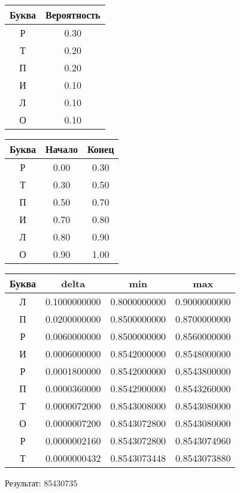\documentclass[a4paper, 12pt]{article}
\begin{document}
\begin{center}
 \begin{tabular}{ |c|c| } 
  \hline
     Буква & Вероятность \\ \hline
Р & 0.30\\\hline
Т & 0.20\\\hline
П & 0.20\\\hline
И & 0.10\\\hline
Л & 0.10\\\hline
О & 0.10
\\ \hline \end{tabular}
\end{center}
\begin{center}
 \begin{tabular}{ |c|c|c| } 
  \hline
     Буква & Начало & Конец \\ \hline
Р & 0.00 & 0.30\\\hline
Т & 0.30 & 0.50\\\hline
П & 0.50 & 0.70\\\hline
И & 0.70 & 0.80\\\hline
Л & 0.80 & 0.90\\\hline
О & 0.90 & 1.00
\\ \hline \end{tabular}
\end{center}
\begin{center}
 \begin{tabular}{ |c|c|c|c| } 
  \hline
     Буква & delta & min & max \\ \hline
Л & 0.1000000000 & 0.8000000000 & 0.9000000000\\\hline
П & 0.0200000000 & 0.8500000000 & 0.8700000000\\\hline
Р & 0.0060000000 & 0.8500000000 & 0.8560000000\\\hline
И & 0.0006000000 & 0.8542000000 & 0.8548000000\\\hline
Р & 0.0001800000 & 0.8542000000 & 0.8543800000\\\hline
П & 0.0000360000 & 0.8542900000 & 0.8543260000\\\hline
Т & 0.0000072000 & 0.8543008000 & 0.8543080000\\\hline
О & 0.0000007200 & 0.8543072800 & 0.8543080000\\\hline
Р & 0.0000002160 & 0.8543072800 & 0.8543074960\\\hline
Т & 0.0000000432 & 0.8543073448 & 0.8543073880
\\ \hline \end{tabular}
\end{center}
Результат: 85430735
\pagebreak
\end{document}
